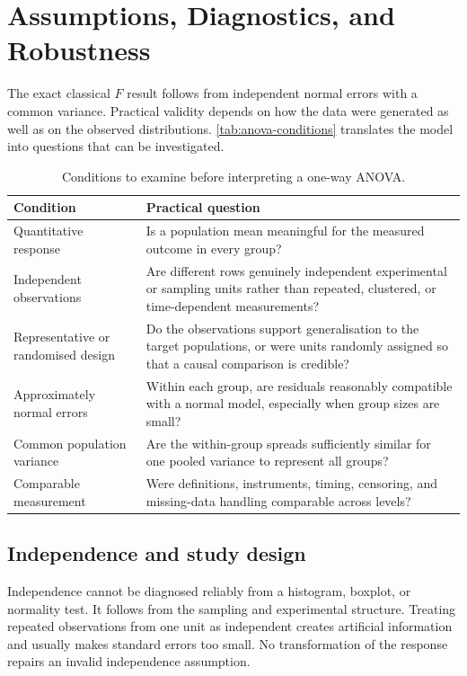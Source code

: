 \newpage

\section{Assumptions, Diagnostics, and Robustness}
\label{sec:anova-assumptions}

The exact classical $F$ result follows from independent normal errors with a common variance. Practical validity depends on how the data were generated as well as on the observed distributions. \autoref{tab:anova-conditions} translates the model into questions that can be investigated.

\begin{table}[htbp]
\centering
\caption{Conditions to examine before interpreting a one-way ANOVA.}
\label{tab:anova-conditions}
\begin{tabularx}{\textwidth}{@{}l>{\raggedright\arraybackslash}X@{}}
\toprule
Condition & Practical question \\
\midrule
Quantitative response & Is a population mean meaningful for the measured outcome in every group? \\
Independent observations & Are different rows genuinely independent experimental or sampling units rather than repeated, clustered, or time-dependent measurements? \\
Representative or randomised design & Do the observations support generalisation to the target populations, or were units randomly assigned so that a causal comparison is credible? \\
Approximately normal errors & Within each group, are residuals reasonably compatible with a normal model, especially when group sizes are small? \\
Common population variance & Are the within-group spreads sufficiently similar for one pooled variance to represent all groups? \\
Comparable measurement & Were definitions, instruments, timing, censoring, and missing-data handling comparable across levels? \\
\bottomrule
\end{tabularx}
\end{table}

\subsection{Independence and study design}

Independence cannot be diagnosed reliably from a histogram, boxplot, or normality test. It follows from the sampling and experimental structure. Treating repeated observations from one unit as independent creates artificial information and usually makes standard errors too small. No transformation of the response repairs an invalid independence assumption.

